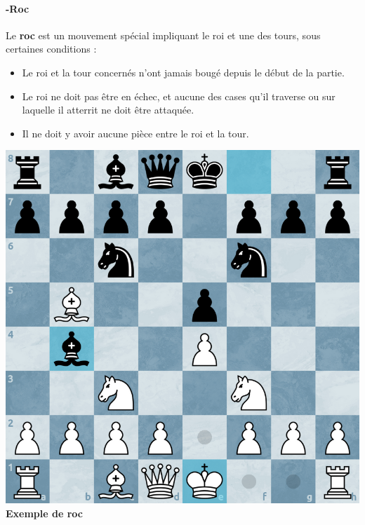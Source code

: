 \documentclass{article}
\begin{document}
\paragraph{-Roc} Le \textbf{roc} est un mouvement spécial impliquant le roi et une des tours, sous certaines conditions :
\begin{itemize}
    \item Le roi et la tour concernés n’ont jamais bougé depuis le début de la partie.
    \item Le roi ne doit pas être en échec, et aucune des cases qu’il traverse ou sur laquelle il atterrit ne doit être attaquée.
    \item Il ne doit y avoir aucune pièce entre le roi et la tour.
\end{itemize}

\noindent
\begin{minipage}{0.48\textwidth}
    \centering
    \includegraphics[width=\textwidth, height=\textwidth]{roc1.png}
    \vspace{0.5cm}
   \textbf{Exemple de roc}
\end{minipage}
\hfill
\end{document}
